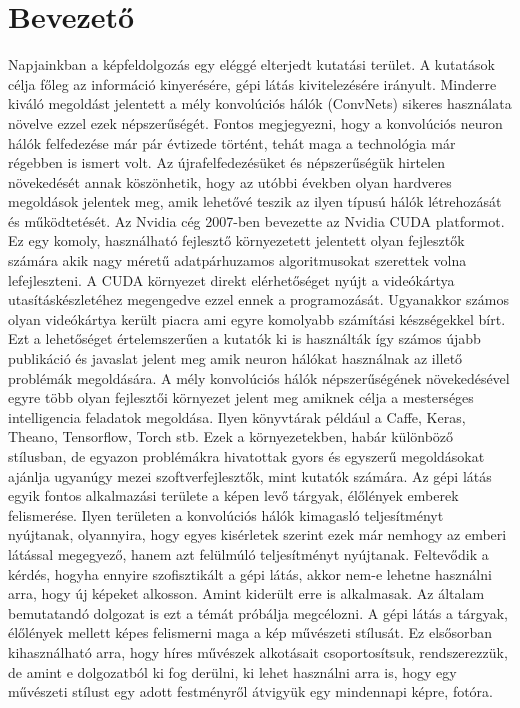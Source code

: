 \documentclass[12pt, a4paper, oneside]{book}
\theoremstyle{tetel}
\newcommand\capterro[1]{%
	\addcontentsline{tce}{chapter}{\protect\makebox[1.3em][l]{\thechapter.}#1}}
\newcommand\capteren[1]{%
	 \addcontentsline{tcen}{chapter}{\protect\makebox[1.3em][l]{\thechapter.}#1}}
\begin{document}

\chapter{Bevezető}
\capterro{Întroducere}
\capteren{Indroduction}

Napjainkban a képfeldolgozás egy eléggé elterjedt kutatási terület. A kutatások célja főleg az információ kinyerésére, gépi látás kivitelezésére irányult. Minderre kiváló megoldást jelentett a mély konvolúciós hálók (ConvNets)\cite{1}\cite{2} sikeres használata növelve ezzel ezek népszerűségét. Fontos megjegyezni, hogy a konvolúciós neuron hálók felfedezése már pár évtizede történt, tehát maga a technológia már régebben is ismert volt. Az újrafelfedezésüket és népszerűségük hirtelen növekedését annak köszönhetik, hogy az utóbbi években olyan hardveres megoldások jelentek meg, amik lehetővé teszik az ilyen típusú hálók létrehozását és működtetését. 
\newline 
\indent
Az Nvidia cég 2007-ben bevezette az Nvidia CUDA platformot\cite{3}. Ez egy komoly, használható fejlesztő környezetett jelentett olyan fejlesztők számára akik nagy méretű adatpárhuzamos algoritmusokat szerettek volna lefejleszteni. A CUDA környezet direkt elérhetőséget nyújt a videókártya utasításkészletéhez megengedve ezzel ennek a programozását. Ugyanakkor számos olyan videókártya került piacra ami egyre komolyabb számítási készségekkel bírt. Ezt a lehetőséget értelemszerűen a kutatók ki is használták így számos újabb publikáció és javaslat jelent meg amik neuron hálókat használnak az illető problémák megoldására.
\newline
\indent
A mély konvolúciós hálók népszerűségének növekedésével egyre több olyan fejlesztői környezet jelent meg amiknek célja a mesterséges intelligencia feladatok megoldása. Ilyen könyvtárak például a Caffe\cite{4}, Keras\cite{5}, Theano\cite{6}, Tensorflow\cite{7}, Torch\cite{8} stb. Ezek a környezetekben, habár különböző stílusban, de egyazon problémákra hivatottak gyors és egyszerű megoldásokat ajánlja ugyanúgy mezei szoftverfejlesztők, mint kutatók számára.
\newline
\indent
Az gépi látás egyik fontos alkalmazási területe a képen levő tárgyak, élőlények emberek felismerése. Ilyen területen a konvolúciós hálók kimagasló teljesítményt nyújtanak, olyannyira, hogy egyes kisérletek szerint ezek már nemhogy az emberi látással megegyező, hanem azt felülmúló teljesítményt nyújtanak\cite{9}. Feltevődik a kérdés, hogyha ennyire szofisztikált a gépi látás, akkor nem-e lehetne használni arra, hogy új képeket alkosson. Amint kiderült erre is alkalmasak. Az általam bemutatandó dolgozat is ezt a témát próbálja megcélozni. A gépi látás a tárgyak, élőlények mellett képes felismerni maga a kép művészeti stílusát. Ez elsősorban kihasználható arra, hogy híres művészek alkotásait csoportosítsuk, rendszerezzük\cite{10}, de amint e dolgozatból ki fog derülni, ki lehet használni arra is, hogy egy művészeti stílust egy adott festményről átvigyük egy mindennapi képre, fotóra. 
\end{document}
